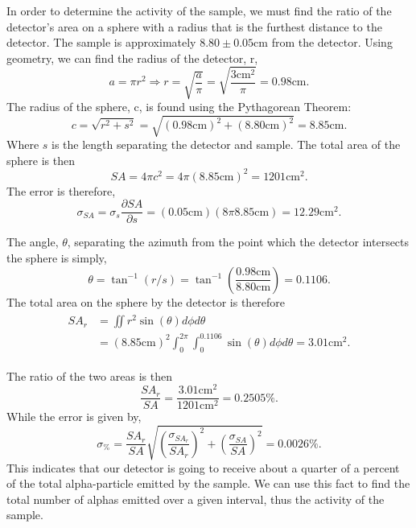 \documentclass[10pt]{IEEEtran}
\begin{document}
In order to determine the activity of the sample, we must find the ratio of the detector's area on a sphere with a radius that is the furthest distance to the detector. The sample is approximately $8.80\pm0.05$cm from the detector. Using geometry, we can find the radius of the detector, r,
	\begin{equation}
		a = \pi r^2 \Rightarrow r = \sqrt{\frac{a}{\pi}}=\sqrt{\frac{3\text{cm}^2}{\pi}} = 0.98\text{cm}.
	\end{equation}
The radius of the sphere, c, is found using the Pythagorean Theorem:
	\begin{equation}
		c = \sqrt{r^2+s^2} = \sqrt{(0.98\text{cm})^2+(8.80\text{cm})^2} = 8.85\text{cm}.
	\end{equation}
Where $s$ is the length separating the detector and sample. The total area of the sphere is then
	\begin{equation}
		SA = 4\pi c^2 = 4\pi (8.85\text{cm})^2 = 1201\text{cm}^2.
	\end{equation}
The error is therefore,
	\begin{equation}
		\sigma_{SA} = \sigma_s \frac{\partial SA}{\partial s}= (0.05\text{cm})(8\pi8.85\text{cm}) = 12.29\text{cm}^2.
	\end{equation}

The angle, $\theta$, separating the azimuth from the point which the detector intersects the sphere is simply,
	\begin{equation}
		\theta = \tan^{-1}(r/s) = \tan^{-1}\left(\frac{0.98\text{cm}}{8.80\text{cm}}\right) = 0.1106.
	\end{equation}
The total area on the sphere by the detector is therefore
	\begin{eqnarray}
		\begin{array}{rl}
			{SA}_r&=\iint r^2\sin(\theta)d\phi d\theta \\
			&=(8.85\text{cm})^2\int_0^{2\pi}\int_0^{0.1106}\sin(\theta)d\phi d\theta = 3.01\text{cm}^2.
		\end{array}
	\end{eqnarray}

The ratio of the two areas is then
	\begin{equation}
		\frac{{SA}_r}{SA} = \frac{3.01\text{cm}^2}{1201\text{cm}^2} = 0.2505\%.
	\end{equation}
While the error is given by,
	\begin{equation}
		\sigma_{\%} = \frac{SA_r}{SA} \sqrt{ \left(\frac{\sigma_{SA_{r}}}{SA_r}\right)^2+\left( \frac{\sigma_{SA}}{SA}\right)^2} = 0.0026\%.
	\end{equation}
This indicates that our detector is going to receive about a quarter of a percent of the total alpha-particle emitted by the sample. We can use this fact to find the total number of alphas emitted over a given interval, thus the activity of the sample.
\end{document}
